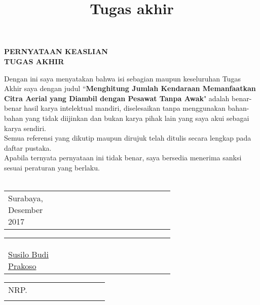 \documentclass[a5paper, 10pt, twoside, bahasa]{report}
\title{Tugas akhir}
\begin{document}
\begin{center}
\Large\textbf{PERNYATAAN KEASLIAN\\}
\Large\textbf{TUGAS AKHIR}
\vspace{1ex}
\end{center}

\setlength{\parindent}{1cm} Dengan ini saya menyatakan bahwa isi sebagian maupun keseluruhan Tugas Akhir saya dengan judul ``\textbf{Menghitung Jumlah Kendaraan Memanfaatkan Citra Aerial yang Diambil dengan Pesawat Tanpa Awak}" adalah benar-benar hasil karya intelektual mandiri, diselesaikan tanpa menggunakan bahan-bahan yang tidak diijinkan dan bukan karya pihak lain yang saya akui sebagai karya sendiri.
\\

\setlength{\parindent}{1cm} Semua referensi yang dikutip maupun dirujuk telah ditulis secara lengkap pada daftar pustaka. 
\\

\setlength{\parindent}{1cm} Apabila ternyata pernyataan ini tidak benar, saya bersedia menerima sanksi sesuai peraturan yang berlaku.
\\
\\

\begin{adjustwidth}{6cm}{}
\begin{tabular}{lcp{0.65\linewidth}}
\centering Surabaya, Desember 2017 & & \\
\end{tabular}
\end{adjustwidth}

\begin{adjustwidth}{5.63cm}{}
\begin{tabular}{lcp{0.65\linewidth}}
\\
\\
\\
\\
\centering \underline{Susilo Budi Prakoso} & & \\
\end{tabular}
\end{adjustwidth}

\begin{adjustwidth}{6.15cm}{}
\begin{tabular}{lcp{0.65\linewidth}}
\centering NRP.  & & \\ & & \\
\end{tabular}
\end{adjustwidth}
\end{document}
